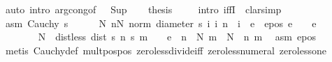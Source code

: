 \begin{isabellebody}
\ {\isacharparenleft}{\kern0pt}auto\ intro{\isacharbang}{\kern0pt}{\isacharcolon}{\kern0pt}\ arg{\isacharunderscore}{\kern0pt}cong{\isacharbrackleft}{\kern0pt}of\ {\isacharunderscore}{\kern0pt}\ {\isacharunderscore}{\kern0pt}\ Sup{\isacharbrackright}{\kern0pt}{\isacharparenright}{\kern0pt}\isanewline
\ \ \isamarkupfalse%
\ {\isacharquery}{\kern0pt}thesis\ \isanewline
\ \ \isamarkupfalse%
\ {\isacharparenleft}{\kern0pt}{\isacharparenleft}{\kern0pt}intro\ iffI{\isacharparenright}{\kern0pt}\ {\isacharsemicolon}{\kern0pt}\ clarsimp{\isacharparenright}{\kern0pt}\isanewline
\ \ \ \ \isamarkupfalse%
\ asm{\isacharcolon}{\kern0pt}\ {\isachardoublequoteopen}Cauchy\ s{\isachardoublequoteclose}\isanewline
\ \ \ \ \isamarkupfalse%
\ {\isachardoublequoteopen}{\isasymexists}N{\isachardot}{\kern0pt}\ {\isasymforall}n{\isasymge}N{\isachardot}{\kern0pt}\ norm\ {\isacharparenleft}{\kern0pt}diameter\ {\isacharbraceleft}{\kern0pt}s\ i\ {\isacharbar}{\kern0pt}i{\isachardot}{\kern0pt}\ n\ {\isasymle}\ i{\isacharbraceright}{\kern0pt}{\isacharparenright}{\kern0pt}\ {\isacharless}{\kern0pt}\ e{\isachardoublequoteclose}\ \ e{\isacharunderscore}{\kern0pt}pos{\isacharcolon}{\kern0pt}\ {\isachardoublequoteopen}e\ {\isachargreater}{\kern0pt}\ {}{\isachardoublequoteclose}\ \ e\isanewline
\ \ \ \ \isamarkupfalse%
\ {\isacharminus}{\kern0pt}\isanewline
\ \ \ \ \ \ \isamarkupfalse%
\ N\ \ dist{\isacharunderscore}{\kern0pt}less{\isacharcolon}{\kern0pt}\ {\isachardoublequoteopen}dist\ {\isacharparenleft}{\kern0pt}s\ n{\isacharparenright}{\kern0pt}\ {\isacharparenleft}{\kern0pt}s\ m{\isacharparenright}{\kern0pt}\ {\isacharless}{\kern0pt}\ {\isacharparenleft}{\kern0pt}{}{\isacharslash}{\kern0pt}{}{\isacharparenright}{\kern0pt}\ {\isacharasterisk}{\kern0pt}\ e{\isachardoublequoteclose}\ \ {\isachardoublequoteopen}n\ {\isasymge}\ N{\isachardoublequoteclose}\ {\isachardoublequoteopen}m\ {\isasymge}\ N{\isachardoublequoteclose}\ \ n\ m\ \isamarkupfalse%
\ asm\ e{\isacharunderscore}{\kern0pt}pos\ \isamarkupfalse%
\ {\isacharparenleft}{\kern0pt}metis\ Cauchy{\isacharunderscore}{\kern0pt}def\ mult{\isacharunderscore}{\kern0pt}pos{\isacharunderscore}{\kern0pt}pos\ zero{\isacharunderscore}{\kern0pt}less{\isacharunderscore}{\kern0pt}divide{\isacharunderscore}{\kern0pt}iff\ zero{\isacharunderscore}{\kern0pt}less{\isacharunderscore}{\kern0pt}numeral\ zero{\isacharunderscore}{\kern0pt}less{\isacharunderscore}{\kern0pt}one{\isacharparenright}{\kern0pt}\isanewline

\end{isabellebody}
